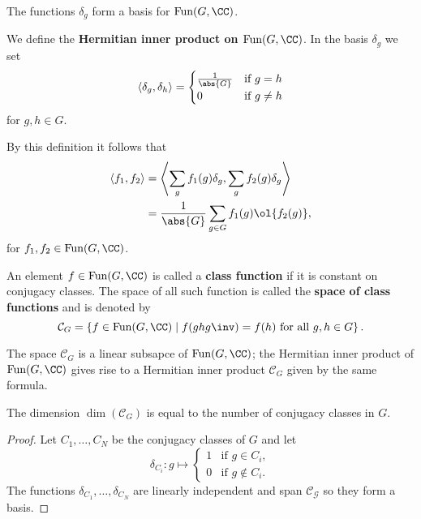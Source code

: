 \documentclass[12pt, a4paper]{article}
\newcommand{\fun}{\text{Fun}}
\begin{document}
\begin{proposition}
    The functions \(\delta_g\) form a basis for \(\fun(G,\CC)\).
\end{proposition}

\begin{definition}
    We define the \textbf{Hermitian inner product on \(\fun(G,\CC)\)}. In the basis \(\delta_g\) we set 
    \[\langle \delta_g,\delta_h \rangle =\begin{cases}
        \frac{1}{\abs{G}} &\text{if } g=h \\
        0 &\text{if } g\neq h
    \end{cases}\]
    for \(g,h\in G\).
\end{definition}

\begin{corollary}
    By this definition it follows that 
    \[\begin{aligned}
        \langle f_1,f_2 \rangle &=\left\langle \sum_g f_1(g)\delta_g, \sum_g f_2(g)\delta_g \right\rangle \\
        &= \frac{1}{\abs{G}} \sum_{g\in G} f_1(g)\ol{f_2(g)},
    \end{aligned}\]
    for \(f_1,f_2 \in \fun(G,\CC)\).
\end{corollary}

\begin{definition}
    An element \(f\in \fun(G,\CC)\) is called a \textbf{class function} if it is constant on conjugacy classes. The space of all such function is called the \textbf{space of class functions} and is denoted by 
    \[\mathcal{C}_G = \left\{ f\in \fun(G,\CC) \mid f(ghg\inv)=f(h) \text{ for all } g,h\in G \right\}.\]
\end{definition}

\begin{proposition}
    The space \(\mathcal{C}_G\) is a linear subsapce of \(\fun(G,\CC)\); the Hermitian inner product of \(\fun(G,\CC)\) gives rise to a Hermitian inner product \(\mathcal{C}_G\) given by the same formula.
\end{proposition}

\begin{mdlemma}
    The dimension \(\dim\left( \mathcal{C}_G \right)\) is equal to the number of conjugacy classes in \(G\).
\end{mdlemma}

\begin{proof}
    Let \(C_1,\ldots,C_N\) be the conjugacy classes of \(G\) and let 
    \[\delta_{C_i} : g \mapsto \begin{cases}
        1 &\text{if } g\in C_i, \\
        0 &\text{if } g\not\in C_i.
    \end{cases}\]
    The functions \(\delta_{C_1},\ldots,\delta_{C_N}\) are linearly independent and span \(\mathcal{C_G}\) so they form a basis.
\end{proof}
\end{document}
